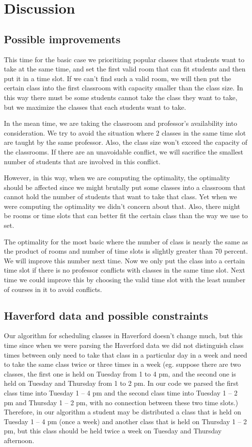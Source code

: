 \documentclass[11pt, oneside]{article}   	%
\begin{document}
\section{Discussion}
\subsection{Possible improvements}
This time for the basic case we prioritizing popular classes that students want to take at the same time, and set the first valid room that can fit students and then put it in a time slot. If we can't find such a valid room, we will then put the certain class into the first classroom with capacity smaller than the class size. In this way there must be some students cannot take the class they want to take, but we maximize the classes that each students want to take.

In the mean time, we are taking the classroom and professor's availability into consideration. We try to avoid the situation where 2 classes in the same time slot are taught by the same professor. Also, the class size won't exceed the capacity of the classrooms. If there are an unavoidable conflict, we will sacrifice the smallest number of students that are involved in this conflict.

However, in this way, when we are computing the optimality, the optimality should be affected since we might brutally put some classes into a classroom that cannot hold the number of students that want to take that class. Yet when we were computing the optimality we didn't concern about that. Also, there might be rooms or time slots that can better fit the certain class than the way we use to set.

The optimality for the most basic where the number of class is nearly the same as the product of rooms and number of time slots is slightly greater than 70 percent. We will improve this number next time. Now we only put the class into a certain time slot if there is no professor conflicts with classes in the same time slot. Next time we could improve this by choosing the valid time slot with the least number of courses in it to avoid conflicts.

\subsection{Haverford data and possible constraints}
Our algorithm for scheduling classes in Haverford doesn't change much, but this time since when we were parsing the Haverford data we did not distinguish class times between only need to take that class in a particular day in a week and need to take the same class twice or three times in a week (eg. suppose there are two classes, the first one is held on Tuesday from 1 to 4 pm, and the second one is held on Tuesday and Thursday from 1 to 2 pm. In our code we parsed the first class time into Tuesday 1 -- 4 pm and the second class time into Tuesday 1 -- 2 pm and Thursday 1 -- 2 pm, with no connection between these two time slots.) Therefore, in our algorithm a student may be distributed a class that is held on Tuesday 1 -- 4 pm (once a week) and another class that is held on Thursday 1 -- 2 pm, but this class should be held twice a week on Tuesday and Thursday afternoon.
\end{document}

